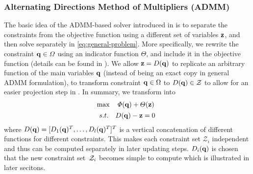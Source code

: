 \documentclass[10pt,twocolumn,twoside]{IEEEtran}
\def\sZ{\mathcal{Z}}
\begin{document}
\subsubsection{Alternating Directions Method of Multipliers (ADMM)}\label{chapter:ADMM review}
The basic idea of the ADMM-based solver introduced in \cite{yang2020multi} is to separate the constraints from the objective function using a different set of variables $\mathbf{z}$, and then solve separately in \eqref{eq:general-problem}.
More specifically, we rewrite the constraint $\mathbf{q}\in\varOmega$ using an indicator function $\varTheta$, and include it in the objective function (details can be found in \cite{yang2020multi}). 
We allow $\mathbf{z} = D(\mathbf{q})$ to replicate an arbitrary function of the main variables $\mathbf{q}$ (instead of being an exact copy in general ADMM formulation), to transform constraint $\mathbf{q}\in\Omega$ to $D(\vq) \in \sZ$ to allow for an easier projection step in . In summary, we transform  into
\begin{equation}\label{eq:ADMMSetConstraint_modified}
	\begin{aligned}
		&\max\quad \varPhi(\vq)+\varTheta(\vz) \\
		& \begin{array}{r@{\quad}c}
			s.t.& D(\vq)-\vz=0
		\end{array} 
	\end{aligned}
\end{equation}
where $D(\mathbf{q})= [D_1(\mathbf{q})^T,\dots,D_l(\mathbf{q})^T]^T$ is a vertical concatenation of different functions for different constraints. This makes each constraint set $\mathcal{Z}_i$ independent and thus can be computed separately in later updating steps. $D_i(\mathbf{q})$ is chosen that the new constraint set~$\mathcal{Z}_i$ becomes simple to compute which is illustrated in later secitons. %
\end{document}
